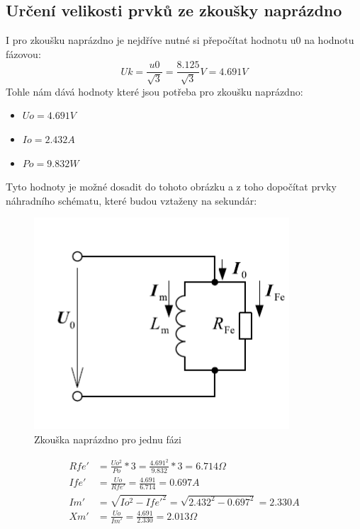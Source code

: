 \documentclass{protokol}
\begin{document}
\subsection{Určení velikosti prvků ze zkoušky naprázdno}
I pro zkoušku naprázdno je nejdříve nutné si přepočítat hodnotu u0 na hodnotu fázovou:
\begin{equation}
    Uk = \frac{u0}{\sqrt{3}} = \frac{8.125}{\sqrt{3}} V = 4.691 V
\end{equation}
Tohle nám dává hodnoty které jsou potřeba pro zkoušku naprázdno:
\begin{itemize}
    \item $Uo = 4.691 V$
    \item $Io = 2.432 A$
    \item $Po = 9.832 W$
\end{itemize}

Tyto hodnoty je možné dosadit do tohoto obrázku a z toho dopočítat prvky náhradního schématu, které budou vztaženy na sekundár:
\begin{figure}[H]
    \centering
    \includegraphics[width=0.5\linewidth]{ZkouskaNaprazdno.png}
    \caption{Zkouška naprázdno pro jednu fázi}
    \label{fig:ZkouskaNaprazdno}
\end{figure}

\begin{align}
    Rfe' &= \frac{Uo^2}{Po}*3 = \frac{4.691^2}{9.832}*3 = 6.714 \Omega \\
    Ife' &= \frac{Uo}{Rfe'} = \frac{4.691}{6.714} = 0.697A \\
    Im' &= \sqrt{Io^2 - Ife'^2} = \sqrt{2.432^2 - 0.697^2} = 2.330A \\
    Xm' &= \frac{Uo}{Im'} = \frac{4.691}{2.330} = 2.013 \Omega
\end{align}
\end{document}
